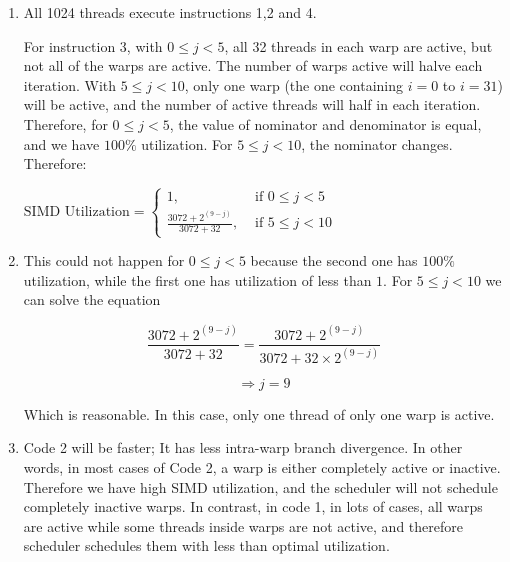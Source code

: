 \documentclass[12pt]{article}
\begin{document}
\begin{enumerate}[label=\alph*)]
\item 
All 1024 threads execute instructions 1,2 and 4.

For instruction 3, with $0 \leq j < 5$, all 32 threads in each warp are active, but not all of the warps are active. The number of warps active will halve each iteration. With $5 \leq j < 10$, only one warp (the one containing $i=0$ to $i=31$) will be active, and the number of active threads will half in each iteration. Therefore, for $0 \leq j < 5$, the value of nominator and denominator is equal, and we have $100\%$ utilization. For $5 \leq j < 10$, the nominator changes. Therefore:


$\text{SIMD Utilization} = \begin{cases} 1, & \text { if } 0 \leq j<5 \\ \frac{3072+2^{(9-j)}}{3072+32}, & \text { if } 5 \leq j<10\end{cases}$


\item 
This could not happen for $0 \leq j < 5$ because the second one has $100\%$ utilization, while the first one has utilization of less than $1$. For $5 \leq j < 10$ we can solve the equation 

$$ \frac{3072+2^{(9-j)}}{3072+32} = \frac{3072+2^{(9-j)}}{3072+32 \times 2^{(9-j)}}$$

$$\Rightarrow j = 9$$

Which is reasonable. In this case, only one thread of only one warp is active.

\item 
Code 2 will be faster; It has less intra-warp branch divergence. In other words, in most cases of Code 2, a warp is either completely active or inactive. Therefore we have high SIMD utilization, and the scheduler will not schedule completely inactive warps. In contrast, in code 1, in lots of cases, all warps are active while some threads inside warps are not active, and therefore scheduler schedules them with less than optimal utilization.

	
	
	
\end{enumerate}
\end{document}
